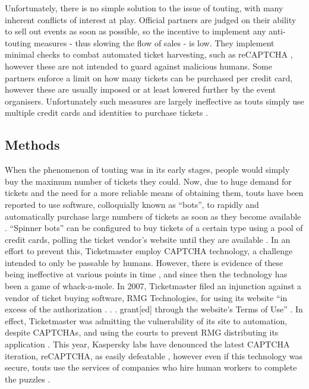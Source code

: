 \documentclass[12pt]{bhamdissertation}
\begin{document}
Unfortunately, there is no simple solution to the issue of touting, with many inherent conflicts of interest at play. Official partners are judged on their ability to sell out events as soon as possible, so the incentive to implement any anti-touting measures - thus slowing the flow of sales - is low. They implement minimal checks to combat automated ticket harvesting, such as reCAPTCHA \autocite{T14}, however these are not intended to guard against malicious humans. Some partners enforce a limit on how many tickets can be purchased per credit card, however these are usually imposed or at least lowered further by the event organisers. Unfortunately such measures are largely ineffective as touts simply use multiple credit cards and identities to purchase tickets \autocite{DJ16}.

\subsection{Methods}

When the phenomenon of touting was in its early stages, people would simply buy the maximum number of tickets they could. Now, due to huge demand for tickets and the need for a more reliable means of obtaining them, touts have been reported to use software, colloquially known as ``bots'', to rapidly and automatically purchase large numbers of tickets as soon as they become available \autocite{Davie16}. ``Spinner bots'' can be configured to buy tickets of a certain type using a pool of credit cards, polling the ticket vendor's website until they are available \autocite{Tic16}. In an effort to prevent this, Ticketmaster employ CAPTCHA technology, a challenge intended to only be passable by humans. However, there is evidence of these being ineffective at various points in time \autocite{AOW05}, and since then the technology has been a game of whack-a-mole. In 2007, Ticketmaster filed an injunction against a vendor of ticket buying software, RMG Technologies, for using its website ``in excess of the authorization . . . grant[ed] through the website's Terms of Use'' \autocite{T09}. In effect, Ticketmaster was admitting the vulnerability of its site to automation, despite CAPTCHAs, and using the courts to prevent RMG distributing its application \autocite{Sam16}. This year, Kaspersky labs have denounced the latest CAPTCHA iteration, reCAPTCHA, as easily defeatable \autocite{K16}, however even if this technology was secure, touts use the services of companies who hire human workers to complete the puzzles \autocite{Davie16}.
\end{document}
